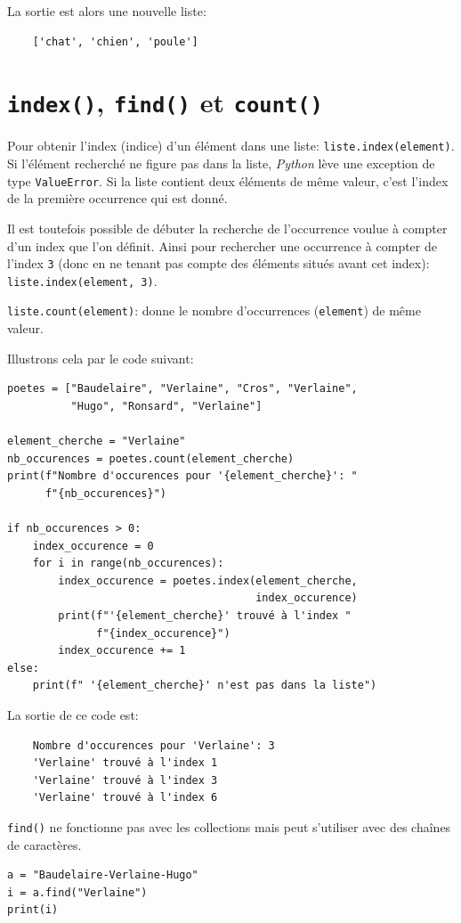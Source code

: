 \documentclass[a4paper,11pt]{book}
\begin{document}
La sortie est alors une nouvelle liste:
\begin{verbatim}
    ['chat', 'chien', 'poule']
\end{verbatim}
\medskip

\section{\texttt{index()}, \texttt{find()} et \texttt{count()}}
Pour obtenir l'index (indice) d'un élément dans une liste: \texttt{liste.index(element)}. Si l'élément recherché ne figure pas dans la liste, \textit{Python} lève une exception de type \texttt{ValueError}. Si la liste contient deux éléments de même valeur, c'est l'index de la première occurrence qui est donné.
\medskip

Il est toutefois possible de débuter la recherche de l'occurrence voulue à compter d'un index que l'on définit. Ainsi pour rechercher une occurrence à compter de l'index \texttt{3} (donc en ne tenant pas compte des éléments situés avant cet index): \texttt{liste.index(element, 3)}.
\medskip

\texttt{liste.count(element)}: donne le nombre d'occurrences (\texttt{element}) de même valeur.
\medskip

Illustrons cela par le code suivant:
\begin{lstlisting}
poetes = ["Baudelaire", "Verlaine", "Cros", "Verlaine",
          "Hugo", "Ronsard", "Verlaine"]

element_cherche = "Verlaine"
nb_occurences = poetes.count(element_cherche)
print(f"Nombre d'occurences pour '{element_cherche}': "
      f"{nb_occurences}")
      
if nb_occurences > 0:
    index_occurence = 0
    for i in range(nb_occurences):
        index_occurence = poetes.index(element_cherche, 
                                       index_occurence)
        print(f"'{element_cherche}' trouvé à l'index "
              f"{index_occurence}")
        index_occurence += 1
else:
    print(f" '{element_cherche}' n'est pas dans la liste")
\end{lstlisting}
\medskip

La sortie de ce code est:
\begin{verbatim}
    Nombre d'occurences pour 'Verlaine': 3
    'Verlaine' trouvé à l'index 1
    'Verlaine' trouvé à l'index 3
    'Verlaine' trouvé à l'index 6
\end{verbatim}
\medskip

\texttt{find()} ne fonctionne pas avec les collections mais peut s'utiliser avec des chaînes de caractères.
\begin{lstlisting}
a = "Baudelaire-Verlaine-Hugo"
i = a.find("Verlaine")
print(i)
\end{lstlisting}
\medskip
\end{document}

